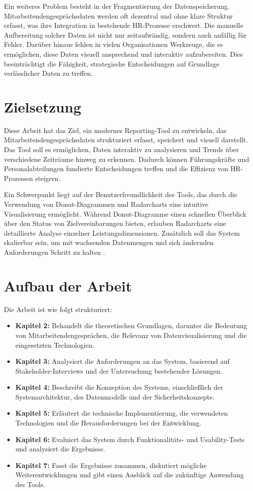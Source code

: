 Ein weiteres Problem besteht in der Fragmentierung der Datenspeicherung. Mitarbeitendengesprächsdaten werden oft dezentral und ohne klare Struktur erfasst, was ihre Integration in bestehende HR-Prozesse erschwert. Die manuelle Aufbereitung solcher Daten ist nicht nur zeitaufwändig, sondern auch anfällig für Fehler. Darüber hinaus fehlen in vielen Organisationen Werkzeuge, die es ermöglichen, diese Daten visuell ansprechend und interaktiv aufzubereiten. Dies beeinträchtigt die Fähigkeit, strategische Entscheidungen auf Grundlage verlässlicher Daten zu treffen.

\section{Zielsetzung}
Diese Arbeit hat das Ziel, ein modernes Reporting-Tool zu entwickeln, das Mitarbeitendengesprächsdaten strukturiert erfasst, speichert und visuell darstellt. Das Tool soll es ermöglichen, Daten interaktiv zu analysieren und Trends über verschiedene Zeiträume hinweg zu erkennen. Dadurch können Führungskräfte und Personalabteilungen fundierte Entscheidungen treffen und die Effizienz von HR-Prozessen steigern.

Ein Schwerpunkt liegt auf der Benutzerfreundlichkeit des Tools, das durch die Verwendung von Donut-Diagrammen und Radarcharts eine intuitive Visualisierung ermöglicht. Während Donut-Diagramme einen schnellen Überblick über den Status von Zielvereinbarungen bieten, erlauben Radarcharts eine detaillierte Analyse einzelner Leistungsdimensionen. Zusätzlich soll das System skalierbar sein, um mit wachsenden Datenmengen und sich ändernden Anforderungen Schritt zu halten \cite{ware2012information}.

\section{Aufbau der Arbeit}
Die Arbeit ist wie folgt strukturiert:
\begin{itemize}
    \item \textbf{Kapitel 2:} Behandelt die theoretischen Grundlagen, darunter die Bedeutung von Mitarbeitendengesprächen, die Relevanz von Datenvisualisierung und die eingesetzten Technologien.
    \item \textbf{Kapitel 3:} Analysiert die Anforderungen an das System, basierend auf Stakeholder-Interviews und der Untersuchung bestehender Lösungen.
    \item \textbf{Kapitel 4:} Beschreibt die Konzeption des Systems, einschließlich der Systemarchitektur, des Datenmodells und der Sicherheitskonzepte.
    \item \textbf{Kapitel 5:} Erläutert die technische Implementierung, die verwendeten Technologien und die Herausforderungen bei der Entwicklung.
    \item \textbf{Kapitel 6:} Evaluiert das System durch Funktionalitäts- und Usability-Tests und analysiert die Ergebnisse.
    \item \textbf{Kapitel 7:} Fasst die Ergebnisse zusammen, diskutiert mögliche Weiterentwicklungen und gibt einen Ausblick auf die zukünftige Anwendung des Tools.
\end{itemize}



